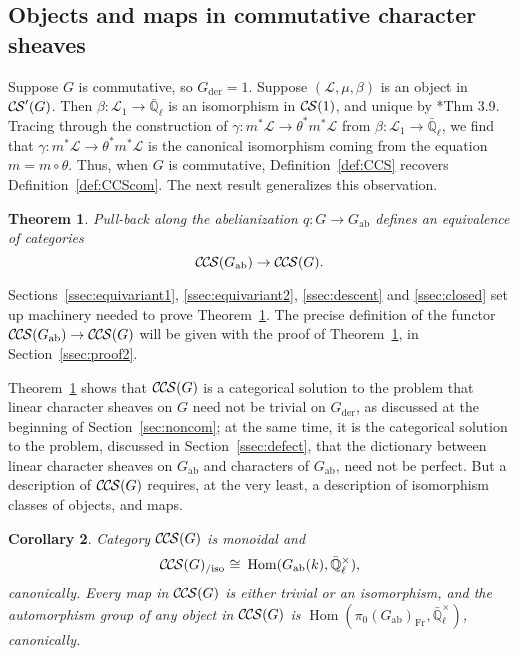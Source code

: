 \documentclass[10pt]{amsart}
\theoremstyle{plain}
\newtheorem{theorem}{Theorem}[section]
\newtheorem{corollary}[theorem]{Corollary}
\theoremstyle{definition}
\newcommand{\EE}{\mathbb{\bar Q}_\ell}
\newcommand{\Fq}{k}
\newcommand{\EEx}{\EE^\times}
\newcommand{\Frob}[1]{\operatorname{Fr}_{#1}}
\DeclareMathOperator{\Hom}{Hom}
\newcommand{\der}{_{\operatorname{der}}}
\newcommand{\ab}{_{\operatorname{ab}}}
\newcommand{\iso}{{\ \cong\ }}
\newcommand{\cs}[1]{{\mathcal{#1}}}
\newcommand{\CS}{{\mathcal{C\hskip-0.8pt S}}}
\newcommand{\CCS}{{\mathcal{C\hskip-.8pt C\hskip-0.8pt S}}}
\newcommand{\CCSiso}[1]{\CCS(#1)_{/\text{iso}}}
\begin{document}
\subsection{Objects and maps in commutative character sheaves} \label{ssec:obmor}

Suppose $G$ is commutative, so $G\der = 1$. 
Suppose $(\cs{L},\mu,\beta)$ is an object in $\CS'(G)$.
Then $\beta : \cs{L}_1\to \EE$ is an isomorphism in $\CS(1)$, and unique by \cite{cunningham-roe:13a}*{Thm 3.9}.
Tracing through the construction of $\gamma : m^*\cs{L} \to \theta^*m^*\cs{L}$ from $\beta : \cs{L}_1\to \EE$, we find 
that $\gamma : m^*\cs{L} \to \theta^*m^*\cs{L}$ is the canonical isomorphism coming from the equation $m = m \circ \theta$. 
Thus, when $G$ is commutative, Definition~\ref{def:CCS} recovers Definition~\ref{def:CCScom}.
The next result generalizes this observation.


\begin{theorem}\label{thm:Gab}
Pull-back along the abelianization $q : G \to G\ab$
defines an equivalence of categories
\[
\CCS(G\ab) \to \CCS(G).
\]
\end{theorem}
%
Sections~\ref{ssec:equivariant1}, \ref{ssec:equivariant2}, \ref{ssec:descent} and \ref{ssec:closed} set up machinery needed to prove Theorem~\ref{thm:Gab}.
The precise definition of the functor $\CCS(G\ab) \to \CCS(G)$ will be given with the proof of Theorem~\ref{thm:Gab}, in Section~\ref{ssec:proof2}.

Theorem~\ref{thm:Gab} shows that $\CCS(G)$ is a categorical solution to the problem that linear character sheaves on $G$ need not be trivial on $G\der$, as discussed at the beginning of Section~\ref{sec:noncom}; at the same time, it is the categorical solution to the problem, discussed in Section~\ref{ssec:defect}, that the dictionary between linear character sheaves on $G\ab$ and characters of $G\ab$, need not be perfect.
%
But a description of $\CCS(G)$ requires, at the very least, a description of isomorphism classes of objects, and maps. 

\begin{corollary}\label{cor:Gab}
Category $\CCS(G)$ is monoidal and 
\[
\CCSiso{G} \iso \Hom(G\ab(\Fq),\EEx),
\]
canonically.
Every map in $\CCS(G)$ is either trivial or an isomorphism, and the automorphism group of any object in $\CCS(G)$ is $\Hom(\pi_0(G\ab)_{\Frob{}},\EEx)$, canonically.
\end{corollary}
\end{document}
